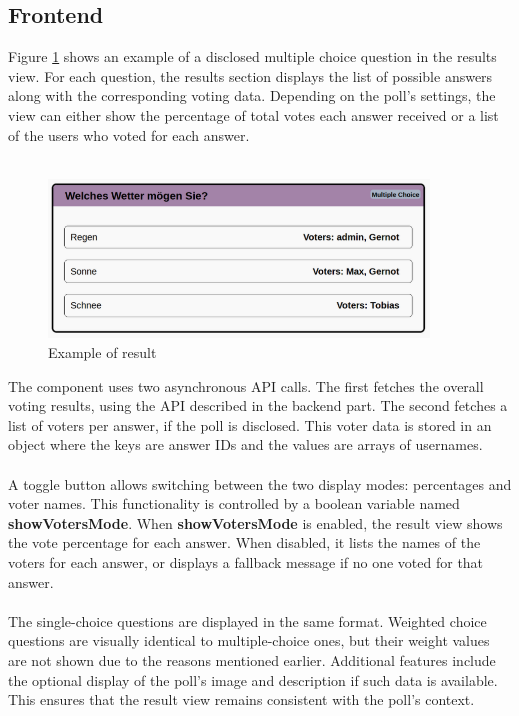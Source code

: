 \documentclass[a4paper,12pt]{report}
\begin{document}
\subsection{Frontend}
Figure \ref{fig:result} shows an example of a disclosed multiple choice question in the results view. For each question, the results section displays the list of possible answers along with the corresponding voting data. Depending on the poll's settings, the view can either show the percentage of total votes each answer received or a list of the users who voted for each answer.\\ \\
\begin{figure}[H] 
	\centering 
	\includegraphics[width=0.9\textwidth]{pics/Results_example.png} 
	\caption{Example of result} 
	\label{fig:result} 
\end{figure}
\noindent
The component uses two asynchronous API calls. The first fetches the overall voting results, using the API described in the backend part. The second fetches a list of voters per answer, if the poll is disclosed. This voter data is stored in an object where the keys are answer IDs and the values are arrays of usernames. \\ \\
A toggle button allows switching between the two display modes: percentages and voter names. This functionality is controlled by a boolean variable named \textbf{showVotersMode}. When \textbf{showVotersMode} is enabled, the result view shows the vote percentage for each answer. When disabled, it lists the names of the voters for each answer, or displays a fallback message if no one voted for that answer. \\ \\
The single-choice questions are displayed in the same format. Weighted choice questions are visually identical to multiple-choice ones, but their weight values are not shown due to the reasons mentioned earlier. Additional features include the optional display of the poll's image and description if such data is available. This ensures that the result view remains consistent with the poll's context.
\end{document}
